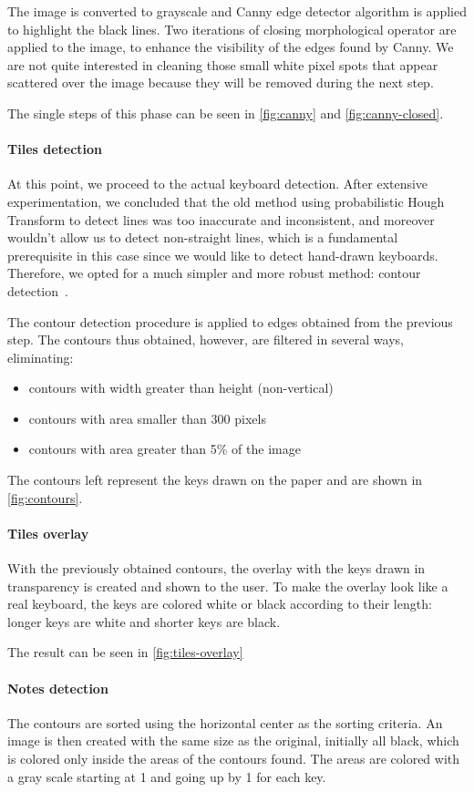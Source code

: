 The image is converted to grayscale and Canny edge detector algorithm is applied to highlight the black lines.
Two iterations of closing morphological operator are applied to the image, to enhance the visibility of the edges found by Canny.
We are not quite interested in cleaning those small white pixel spots that appear scattered over the image
because they will be removed during the next step.

The single steps of this phase can be seen in \autoref{fig:canny} and \autoref{fig:canny-closed}.

\paragraph{Tiles detection}
At this point, we proceed to the actual keyboard detection.
After extensive experimentation, we concluded that the old method using probabilistic Hough Transform to detect lines
was too inaccurate and inconsistent, and moreover wouldn't allow us to detect non-straight lines,
which is a fundamental prerequisite in this case since we would like to detect hand-drawn keyboards.
Therefore, we opted for a much simpler and more robust method: contour detection~\cite{contour-detection}.

The contour detection procedure is applied to edges obtained from the previous step.
The contours thus obtained, however, are filtered in several ways, eliminating:
\begin{itemize}
	\item contours with width greater than height (non-vertical)
	\item contours with area smaller than 300 pixels
	\item contours with area greater than 5\% of the image
\end{itemize}
The contours left represent the keys drawn on the paper and are shown in \autoref{fig:contours}.

\paragraph{Tiles overlay}
With the previously obtained contours, the overlay with the keys drawn in transparency is created and shown to the user.
To make the overlay look like a real keyboard, the keys are colored white or black according to their length:
longer keys are white and shorter keys are black.

The result can be seen in \autoref{fig:tiles-overlay}

\paragraph{Notes detection}\label{par:notes-detection}
The contours are sorted using the horizontal center as the sorting criteria.
An image is then created with the same size as the original, initially all black,
which is colored only inside the areas of the contours found.
The areas are colored with a gray scale starting at 1 and going up by 1 for each key.

